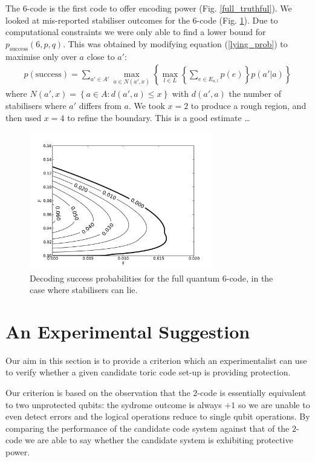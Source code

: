 The $6$-code is the first code to offer encoding power (Fig. \ref{full_truthful}). We looked at mis-reported stabiliser outcomes for the $6$-code (Fig. \ref{full_lying}). Due to computational constraints we were only able to find a lower bound for $p_{\text{success}}(6, p, q)$. This was obtained by modifying equation (\ref{lying_prob}) to maximise only over $a$ close to $a'$:
\begin{align} \label{approx_eq}
  p(\text{success})= \sum_{a'\in A'} \max_{a \in N(a',x)} \left\{ \max_{l \in L} \left\{\sum_{e \in E_{a,l}} p(e) \right\} p(a' \vert a) \right\}
\end{align}
where $N(a', x) = \left\{a \in A : d(a', a) \leq x \right\}$ with $d(a', a)$ the number of stabilisers where $a'$ differs from $a$. We took $x = 2$ to produce a rough region, and then used $x=4$ to refine the boundary. This is a good estimate \ldots

\begin{figure}[htb]
  \begin{center}
    \includegraphics[width=8cm]{assets/full_lying.pdf}
  \end{center}
  \caption{Decoding success probabilities for the full quantum $6$-code, in the case where stabilisers can lie.}
  \label{full_lying}
\end{figure}


\section{An Experimental Suggestion}

Our aim in this section is to provide a criterion which an experimentalist can use to verify whether a given candidate toric code set-up is providing protection.

Our criterion is based on the observation that the $2$-code is essentially equivalent to two unprotected qubits: the sydrome outcome is always $+1$ so we are unable to even detect errors and the logical operations reduce to single qubit operations. By comparing the performance of the candidate code system against that of the $2$-code we are able to say whether the candidate system is exhibiting protective power. 


